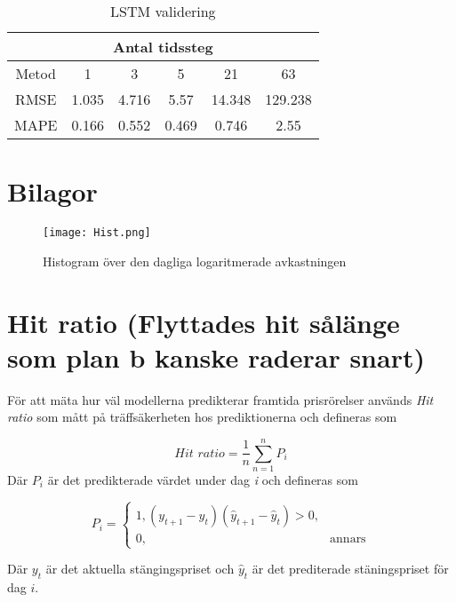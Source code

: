 \documentclass[12pt]{article}
\begin{document}
\begin{table}[H]
\caption{LSTM validering}
\label{tab:my-table}
\begin{tabular}{|c|c|c|c|c|c|}
\hline
\multicolumn{6}{|c|}{Antal tidssteg}             \\ \hline
Metod & 1     & 3     & 5     & 21     & 63      \\ \hline
RMSE  & 1.035 & 4.716 & 5.57  & 14.348 & 129.238 \\ \hline
MAPE  & 0.166 & 0.552 & 0.469 & 0.746  & 2.55    \\ \hline
\end{tabular}
\end{table}





\newpage
\section*{Bilagor}
\begin{figure}[H]
\caption{Histogram över den dagliga logaritmerade avkastningen}
\texttt{[image: Hist.png]}
\centering

\end{figure}

\newpage
\section*{Hit ratio (Flyttades hit sålänge som plan b kanske raderar snart)}
För att mäta hur väl modellerna predikterar framtida prisrörelser används \emph{Hit ratio} \parencite{10.1371/journal.pone.0155133} som mått på träffsäkerheten hos prediktionerna och defineras som 

\begin{equation*}
\textit{Hit ratio}=\frac{1}{n} \sum_{n=1}^{n}P_{i}
\end{equation*}
Där $P_{i}$ är det predikterade värdet under dag \emph{i} och defineras som 

\begin{equation*}
P_{i} = 
\begin{cases}

1, (y_{t+1}-y_{t})(\hat{y}_{t+1}-\hat{y}_{t}) > 0, \\
0, & \text{annars}

\end{cases}
\end{equation*}

Där $y_{t}$ är det aktuella stängingspriset och $\hat{y}_{t}$ är det prediterade stäningspriset för dag $i$. 



\newpage
\printbibliography
\end{document}
